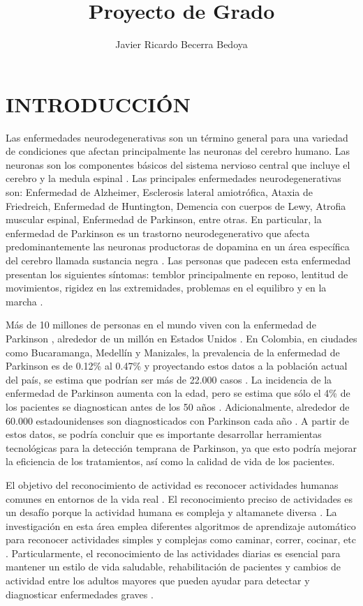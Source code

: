 \documentclass[11pt]{report}
\title{Proyecto de Grado}
\author{Javier Ricardo Becerra Bedoya}
\begin{document}
\maketitle

\chapter{INTRODUCCIÓN}

Las enfermedades neurodegenerativas son un término general para una variedad de condiciones que afectan principalmente las neuronas del cerebro humano. Las neuronas son los componentes básicos del sistema nervioso central que incluye el cerebro y la medula espinal \cite{Neuro}. Las principales enfermedades neurodegenerativas son: Enfermedad de Alzheimer, Esclerosis lateral amiotrófica, Ataxia de Friedreich, Enfermedad de Huntington, Demencia con cuerpos de Lewy, Atrofia muscular espinal, Enfermedad de Parkinson, entre otras. En particular, la enfermedad de Parkinson es un trastorno neurodegenerativo que afecta predominantemente las neuronas productoras de dopamina en un área específica del cerebro llamada sustancia negra \cite{ParkFound}. Las personas que padecen esta enfermedad presentan los siguientes síntomas: temblor principalmente en reposo, lentitud de movimientos, rigidez en las extremidades, problemas en el equilibro y en la marcha \cite{ParkFound}.
\par
\medskip
\noindent
 Más de 10 millones de personas en el mundo viven con la enfermedad de Parkinson \cite{Estadistica}, alrededor de un millón en Estados Unidos \cite{Estadistica}. En Colombia, en ciudades como Bucaramanga, Medellín y Manizales, la prevalencia de la enfermedad de Parkinson es de 0.12\% al 0.47\% y proyectando estos datos a la población actual del país, se estima que podrían ser más de 22.000 casos \cite{colprensa}. La incidencia de la enfermedad de Parkinson aumenta con la edad, pero se estima que sólo el 4\% de los pacientes se diagnostican antes de los 50 años \cite{Estadistica}. Adicionalmente, alrededor de 60.000 estadounidenses son diagnosticados con Parkinson cada año \cite{Estadistica}. A partir de estos datos, se podría concluir que es importante desarrollar herramientas tecnológicas para la detección temprana de Parkinson, ya que esto podría mejorar la eficiencia de los tratamientos, así como la calidad de vida de los pacientes.
\par
\medskip
\noindent
El objetivo del reconocimiento de actividad es reconocer actividades humanas comunes en entornos de la vida real \cite{kim2010human}. El reconocimiento preciso de actividades es un desafío porque la actividad humana es compleja y altamanete diversa \cite{kim2010human}. La investigación en esta área emplea diferentes algoritmos de aprendizaje automático para reconocer actividades simples y complejas como caminar, correr, cocinar, etc \cite{cao2018gchar}. Particularmente, el reconocimiento de las actividades diarias es esencial para mantener un estilo de vida saludable, rehabilitación de pacientes y cambios de actividad entre los adultos mayores que pueden ayudar para detectar y diagnosticar enfermedades graves \cite{cao2018gchar}.
\end{document}
